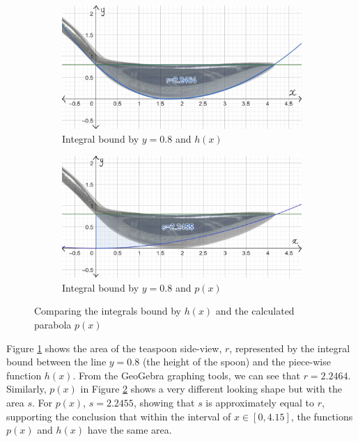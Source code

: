 \documentclass[12pt]{article}
\begin{document}
\begin{figure}[h]
     \centering
     \begin{subfigure}[b]{0.42\textwidth}
         \centering
         \includegraphics[width=\textwidth]{images/intbw r.jpg}
         \caption{Integral bound by $y=0.8$ and $h(x)$}
         \label{fig:pwabove}
     \end{subfigure}
     \hfill
     \begin{subfigure}[b]{0.42\textwidth}
         \centering
         \includegraphics[width=\textwidth]{images/int btw s.jpg}
         \caption{Integral bound by $y=0.8$ and $p(x)$}
         \label{fig:pxabove}
     \end{subfigure}
     \hfill
     \caption{Comparing the integrals bound by $h(x)$ and the calculated parabola $p(x)$}
     \label{ints.geo}
\end{figure}

Figure \ref{fig:pwabove} shows the area of the teaspoon side-view, $r$, represented by the integral bound between the line $y=0.8$ (the height of the spoon) and the piece-wise function $h(x)$. From the GeoGebra graphing tools, we can see that $r=2.2464$. Similarly, $p(x)$ in Figure \ref{fig:pxabove} shows a very different looking shape but with the area $s$. For $p(x)$, $s=2.2455$, showing that $s$ is approximately equal to $r$, supporting the conclusion that within the interval of $x \in [0,4.15]$, the functions $p(x)$ and $h(x)$ have the same area. 
\end{document}
